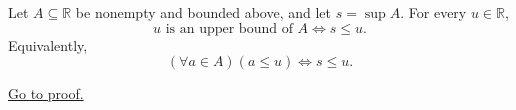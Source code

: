 \begin{proposition}
\label{prop:upper-bound-comparison-with-the-supremum}
Let $A\subseteq\mathbb{R}$ be nonempty and bounded above, and let
$s=\sup A$. For every $u\in\mathbb{R}$,
\[
  u\text{ is an upper bound of }A
  \Longleftrightarrow
  s\leq u.
\]
Equivalently,
\[
  (\forall a\in A)(a\leq u)
  \Longleftrightarrow
  s\leq u.
\]

\hyperref[prf:upper-bound-comparison-with-the-supremum]{Go to proof.}
\end{proposition}